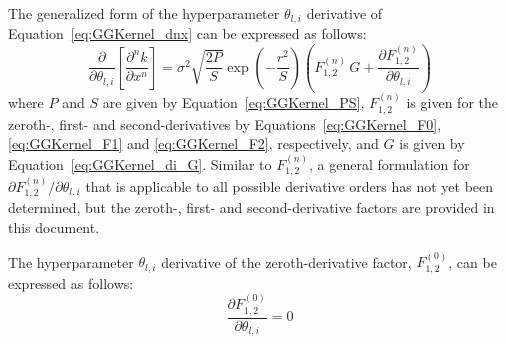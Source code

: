 \documentclass{article}
\begin{document}
The generalized form of the hyperparameter $\theta_{l,i}$ derivative of Equation~\eqref{eq:GGKernel_dnx} can be expressed as follows:
\begin{equation}
\label{eq:GGKernel_di_d1x}
	\frac{\partial}{\partial \theta_{l,i}} \left[\frac{\partial^n k}{\partial x^n}\right] = \sigma^2 \sqrt{\frac{2P}{S}} \exp{\left(-\frac{r^2}{S}\right)} \left(F^{\left(n\right)}_{1,2} \, G + \frac{\partial F^{\left(n\right)}_{1,2}}{\partial \theta_{l,i}}\right)
\end{equation}
where $P$ and $S$ are given by Equation~\eqref{eq:GGKernel_PS}, $F^{\left(n\right)}_{1,2}$ is given for the zeroth-, first- and second-derivatives by Equations~\eqref{eq:GGKernel_F0}, \eqref{eq:GGKernel_F1} and \eqref{eq:GGKernel_F2}, respectively, and $G$ is given by Equation~\eqref{eq:GGKernel_di_G}. Similar to $F^{\left(n\right)}_{1,2}$, a general formulation for $\partial F^{\left(n\right)}_{1,2}/\partial \theta_{l,i}$ that is applicable to all possible derivative orders has not yet been determined, but the zeroth-, first- and second-derivative factors are provided in this document.

The hyperparameter $\theta_{l,i}$ derivative of the zeroth-derivative factor, $F^{\left(0\right)}_{1,2}$, can be expressed as follows:
\begin{equation}
\label{eq:GGKernel_diF0}
	\frac{\partial F^{\left(0\right)}_{1,2}}{\partial \theta_{l,i}} = 0
\end{equation}
\end{document}
